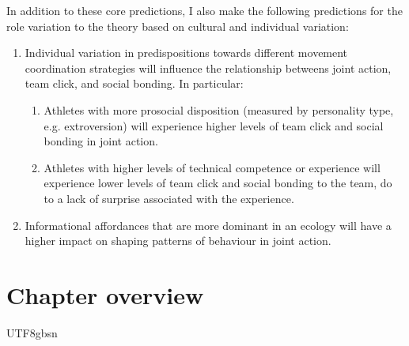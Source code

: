 \begin{CJK}{UTF8}{gbsn}
In addition to these core predictions, I also make the following predictions for the role variation to the theory based on cultural and individual variation:

\begin{enumerate}
  \item Individual variation in predispositions towards different movement coordination strategies will influence the relationship betweens joint action, team click, and social bonding.  In particular:
      \begin{enumerate}
        \item Athletes with more prosocial disposition (measured by personality type, e.g. extroversion) will experience higher levels of team click and social bonding in joint action.
        \item Athletes with higher levels of technical competence or experience will experience lower levels of team click and social bonding to the team, do to a lack of surprise associated with the experience.
      \end{enumerate}

  \item Informational affordances that are more dominant in an ecology will have a higher impact on shaping patterns of behaviour in joint action.

\end{enumerate}





\section{Chapter overview}


                                              \end{CJK}{UTF8}{gbsn}
